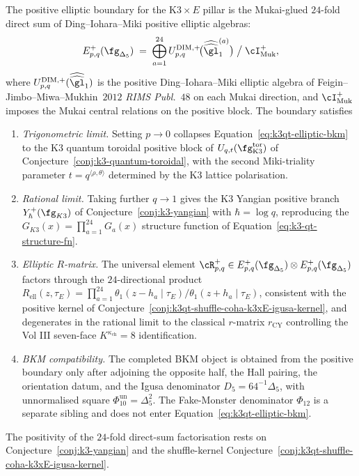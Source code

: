 \begin{proposition}
The positive elliptic boundary for the $\mathrm K3\times E$ pillar is
the Mukai-glued $24$-fold direct sum of Ding--Iohara--Miki positive
elliptic algebras:
\begin{equation}
\label{eq:k3qt-elliptic-bkm}
E^+_{p,q}(\fg_{\Delta_5})
\;=\;
\bigoplus_{a = 1}^{24}
U_{p,q}^{\mathrm{DIM},+}\!\bigl(\widehat{\widehat{\gl}}_1^{(a)}\bigr)
\;\big/\; \cI_{\mathrm{Muk}}^{+},
\end{equation}
where $U_{p,q}^{\mathrm{DIM},+}(\widehat{\widehat{\gl}}_1)$ is the
positive Ding--Iohara--Miki elliptic algebra of
Feigin--Jimbo--Miwa--Mukhin~$2012$ \emph{RIMS Publ.}~$48$ on each
Mukai direction, and $\cI_{\mathrm{Muk}}^{+}$ imposes the Mukai
central relations on the positive block. The boundary satisfies
\begin{enumerate}
 \item \emph{Trigonometric limit.} Setting $p \to 0$ collapses
 Equation~\eqref{eq:k3qt-elliptic-bkm} to the K3 quantum toroidal
 positive block of $U_{q,t}(\fg_{\mathrm K3}^{\mathrm{tor}})$ of
 Conjecture~\ref{conj:k3-quantum-toroidal}, with the second
 Miki-triality parameter $t = q^{\langle \rho, \theta \rangle}$
 determined by the K3 lattice polarisation.
 \item \emph{Rational limit.} Taking further $q \to 1$ gives the
 K3 Yangian positive branch $Y^+_\hbar(\fg_{K3})$ of
 Conjecture~\ref{conj:k3-yangian} with $\hbar = \log q$,
 reproducing the $G_{K3}(x) = \prod_{a=1}^{24} G_a(x)$ structure
 function of Equation~\eqref{eq:k3-qt-structure-fn}.
 \item \emph{Elliptic $R$-matrix.} The universal element
 $\cR^+_{p,q} \in E^+_{p,q}(\fg_{\Delta_5})
 \otimes E^+_{p,q}(\fg_{\Delta_5})$ factors through the
 $24$-directional product
 $R_{\mathrm{ell}}(z, \tau_E)
 = \prod_{a = 1}^{24}
 \theta_1(z - h_a \mid \tau_E) / \theta_1(z + h_a \mid \tau_E)$,
 consistent with the positive kernel of
 Conjecture~\ref{conj:k3qt-shuffle-coha-k3xE-igusa-kernel}, and
 degenerates in the rational limit to the classical $r$-matrix
 $r_{\mathrm{CY}}$ controlling the Vol III seven-face
 $K^{\kappa_{\mathrm{ch}}}=8$ identification.
 \item \emph{BKM compatibility.} The completed BKM object is obtained
 from the positive boundary only after adjoining the opposite half,
 the Hall pairing, the orientation datum, and the Igusa denominator
$D_5=64^{-1}\Delta_5$, with unnormalised square
$\Phi_{10}^{\mathrm{un}}=\Delta_5^2$. The
 Fake-Monster denominator $\Phi_{12}$ is a separate sibling and does
 not enter Equation~\eqref{eq:k3qt-elliptic-bkm}.
\end{enumerate}
The positivity of the $24$-fold direct-sum factorisation rests on
Conjecture~\ref{conj:k3-yangian} and the shuffle-kernel
Conjecture~\ref{conj:k3qt-shuffle-coha-k3xE-igusa-kernel}.
\end{proposition}


